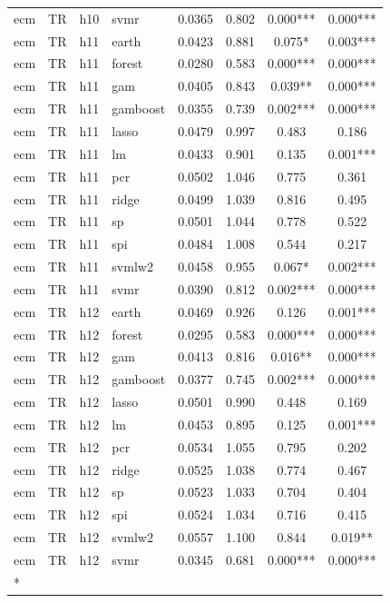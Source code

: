 \begin{ThreePartTable}
\begin{longtable}[t]{llclcccc}
ecm & TR & h10 & svmr & 0.0365 & 0.802 & 0.000*** & 0.000***\\
\addlinespace
ecm & TR & h11 & earth & 0.0423 & 0.881 & 0.075* & 0.003***\\
ecm & TR & h11 & forest & 0.0280 & 0.583 & 0.000*** & 0.000***\\
ecm & TR & h11 & gam & 0.0405 & 0.843 & 0.039** & 0.000***\\
ecm & TR & h11 & gamboost & 0.0355 & 0.739 & 0.002*** & 0.000***\\
ecm & TR & h11 & lasso & 0.0479 & 0.997 & 0.483 & 0.186\\
ecm & TR & h11 & lm & 0.0433 & 0.901 & 0.135 & 0.001***\\
ecm & TR & h11 & pcr & 0.0502 & 1.046 & 0.775 & 0.361\\
ecm & TR & h11 & ridge & 0.0499 & 1.039 & 0.816 & 0.495\\
ecm & TR & h11 & sp & 0.0501 & 1.044 & 0.778 & 0.522\\
ecm & TR & h11 & spi & 0.0484 & 1.008 & 0.544 & 0.217\\
ecm & TR & h11 & svmlw2 & 0.0458 & 0.955 & 0.067* & 0.002***\\
ecm & TR & h11 & svmr & 0.0390 & 0.812 & 0.002*** & 0.000***\\
\addlinespace
ecm & TR & h12 & earth & 0.0469 & 0.926 & 0.126 & 0.001***\\
ecm & TR & h12 & forest & 0.0295 & 0.583 & 0.000*** & 0.000***\\
ecm & TR & h12 & gam & 0.0413 & 0.816 & 0.016** & 0.000***\\
ecm & TR & h12 & gamboost & 0.0377 & 0.745 & 0.002*** & 0.000***\\
ecm & TR & h12 & lasso & 0.0501 & 0.990 & 0.448 & 0.169\\
ecm & TR & h12 & lm & 0.0453 & 0.895 & 0.125 & 0.001***\\
ecm & TR & h12 & pcr & 0.0534 & 1.055 & 0.795 & 0.202\\
ecm & TR & h12 & ridge & 0.0525 & 1.038 & 0.774 & 0.467\\
ecm & TR & h12 & sp & 0.0523 & 1.033 & 0.704 & 0.404\\
ecm & TR & h12 & spi & 0.0524 & 1.034 & 0.716 & 0.415\\
ecm & TR & h12 & svmlw2 & 0.0557 & 1.100 & 0.844 & 0.019**\\
ecm & TR & h12 & svmr & 0.0345 & 0.681 & 0.000*** & 0.000***\\*
\end{longtable}
\end{ThreePartTable}
\endgroup{}
